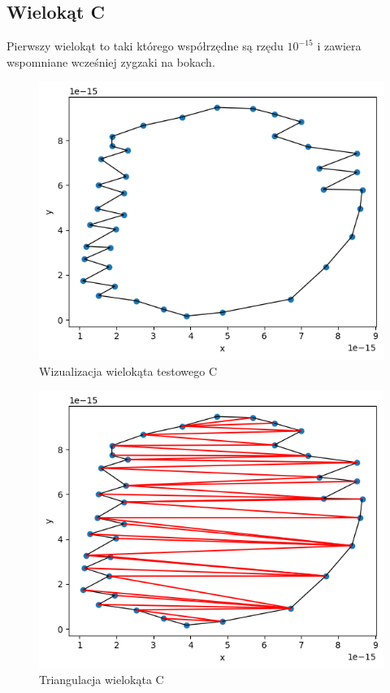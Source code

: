 \documentclass[a4paper]{article}
\begin{document}
    \subsection{Wielokąt C}
    Pierwszy wielokąt to taki którego współrzędne są rzędu $10^{-15}$ i zawiera wspomniane wcześniej
    zygzaki na bokach.
    \begin{figure}[H]
        \centering
        \includegraphics[width=.65\textwidth]{test_c_poly.png}
        \caption{Wizualizacja wielokąta testowego C}
        \label{fig:test_c_poly}
    \end{figure}
    \begin{figure}[H]
        \centering
        \includegraphics[width=.65\textwidth]{test_c_tri.png}
        \caption{Triangulacja wielokąta C}
        \label{fig:test_c_tri}
    \end{figure}
\end{document}
